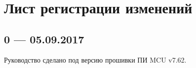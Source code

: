 \section*{ Лист регистрации изменений}

\subsection*{0 --- 05.09.2017}

Руководство сделано под версию прошивки ПИ MCU v7.62. 